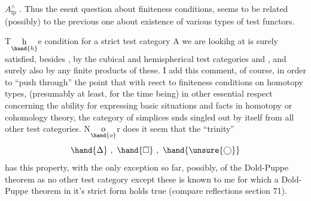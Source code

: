 
$A^{\wedge}_{\mathrm{fp}}$ . Thus the esent question about finiteness conditions, seems
to be related (possibly) to the previous one about existence of various
types of test functors.

T\(\underset{\hand{h}}{\text{h}}\)e condition for a strict test category A we are lookihg at is
surely satisfied, besides \hand{$\Delta$}, by the cubical and hemispherical test
categories \hand{$\Box$} and \hand{$\unsure{\bigcirc}$}, and surely also by any finite products of these.
I add this comment, of course, in order to ``push through'' the point
that  with reect to finiteness conditions on homotopy types, 
(presumably at least, for the time being) in  other essential respect
concerning the ability  for expressing basic situations and facts in
homotopy or cohomology theory, the category of simplices snds singled
out by itself from all other test categories. N\(\underset{\hand{o}}{\text{o}}\)r does it seem that
the ``trinity''
\[ \hand{\Delta}\ ,\ \hand{\Box}\ ,\ \hand{\unsure{\bigcirc}} \]
has this property, with the only exception so far, possibly, of the
Dold-Puppe theorem\hand{(} as no other test category except these is known to
me for which a Dold-Puppe theorem in it's strict form holds true
(compare reflections section 71)\hand{)}.

